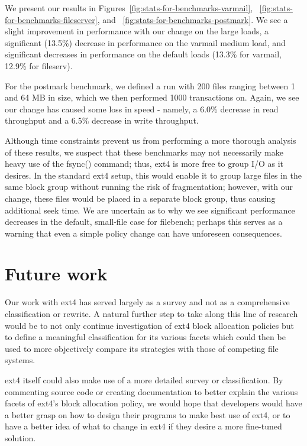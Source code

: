 \documentclass{acm_proc_article-sp}
\begin{document}
We present our results in Figures~\ref{fig:stats-for-benchmarks-varmail}, ~\ref{fig:stats-for-benchmarks-fileserver}, and ~\ref{fig:stats-for-benchmarks-postmark}.  We see a slight improvement in performance with our change on the large loads, a significant (13.5\%) decrease in performance on the varmail medium load, and significant decreases in performance on the default loads (13.3\% for varmail, 12.9\% for fileserv). 
 
For the postmark benchmark, we defined a run with 200 files ranging between 1 and 64 MB in size, which we then performed 1000 transactions on.  Again, we see our change has caused some loss in speed - namely, a 6.0\% decrease in read throughput and a 6.5\% decrease in write throughput.
 
Although time constraints prevent us from performing a more thorough analysis of these results, we suspect that these benchmarks may not necessarily make heavy use of the fsync() command; thus, ext4 is more free to group I/O as it desires.  In the standard ext4 setup, this would enable it to group large files in the same block group without running the risk of fragmentation; however, with our change, these files would be placed in a separate block group, thus causing additional seek time.  We are uncertain as to why we see significant performance decreases in the default, small-file case for filebench; perhaps this serves as a warning that even a simple policy change can have unforeseen consequences.



\section{Future work}
\label{sec:Future-work}
Our work with ext4 has served largely as a survey and not as a comprehensive classification or rewrite.  A natural further step to take along this line of research would be to not only continue investigation of ext4 block allocation policies but to define a meaningful classification for its various facets which could then be used to more objectively compare its strategies with those of competing file systems.
 
ext4 itself could also make use of a more detailed survey or classification.  By commenting source code or creating documentation to better explain the various facets of ext4's block allocation policy, we would hope that developers would have a better grasp on how to design their programs to make best use of ext4, or to have a better idea of what to change in ext4 if they desire a more fine-tuned solution.
 
\end{document}
